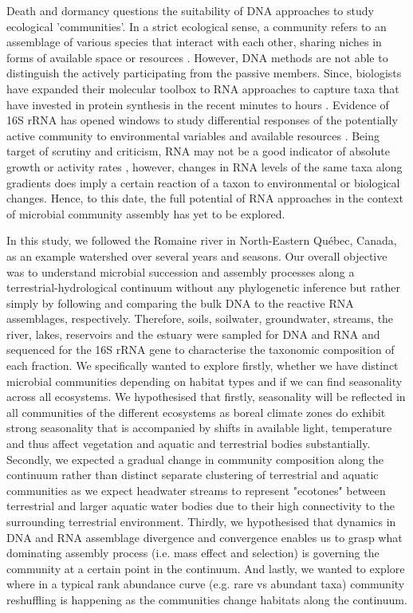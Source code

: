 \documentclass[12pt,a4paper]{article} %
\begin{document}
Death and dormancy \citep{Cole1999, Jones2010} questions the suitability of DNA approaches to study ecological 'communities'. In a strict ecological sense, a community refers to an assemblage of various species that interact with each other, sharing niches in forms of available space or resources \citep{Konopka2009}. However, DNA methods are not able to distinguish the actively participating from the passive members. Since, biologists have expanded their molecular toolbox to RNA approaches to capture taxa that have invested in protein synthesis in the recent minutes to hours \citep{Blazewicz2013}. Evidence of 16S rRNA has opened windows to study differential responses of the potentially active community to environmental variables and available resources \citep{Osterholz2016}. Being target of scrutiny and criticism, RNA may not be a good indicator of absolute growth or activity rates \citep{Blazewicz2013}, however, changes in RNA levels of the same taxa along gradients does imply a certain reaction of a taxon to environmental or biological changes. Hence, to this date, the full potential of RNA approaches in the context of microbial community assembly has yet to be explored.

In this study, we followed the Romaine river in North-Eastern Qu\'{e}bec, Canada, as an example watershed over several years and seasons. Our overall objective was to understand microbial succession and assembly processes along a terrestrial-hydrological continuum without any phylogenetic inference but rather simply by following and comparing the bulk DNA to the reactive RNA assemblages, respectively. Therefore, soils, soilwater, groundwater, streams, the river, lakes, reservoirs and the estuary were sampled for DNA and RNA and sequenced for the 16S rRNA gene to characterise the taxonomic composition of each fraction. We specifically wanted to explore firstly, whether we have distinct microbial communities depending on habitat types and if we can find seasonality across all ecosystems. We hypothesised that firstly, seasonality will be reflected in all communities of the different ecosystems as boreal climate zones do exhibit strong seasonality that is accompanied by shifts in available light, temperature and thus affect vegetation and aquatic and terrestrial bodies substantially. Secondly, we expected a gradual change in community composition along the continuum rather than distinct separate clustering of terrestrial and aquatic communities as we expect headwater streams to represent "ecotones" between terrestrial and larger aquatic water bodies due to their high connectivity to the surrounding terrestrial environment. Thirdly, we hypothesised that dynamics in DNA and RNA assemblage divergence and convergence enables us to grasp what dominating assembly process (i.e. mass effect and selection) is governing the community at a certain point in the continuum. And lastly, we wanted to explore where in a typical rank abundance curve (e.g. rare vs abundant taxa) community reshuffling is happening as the communities change habitats along the continuum.
\end{document}
